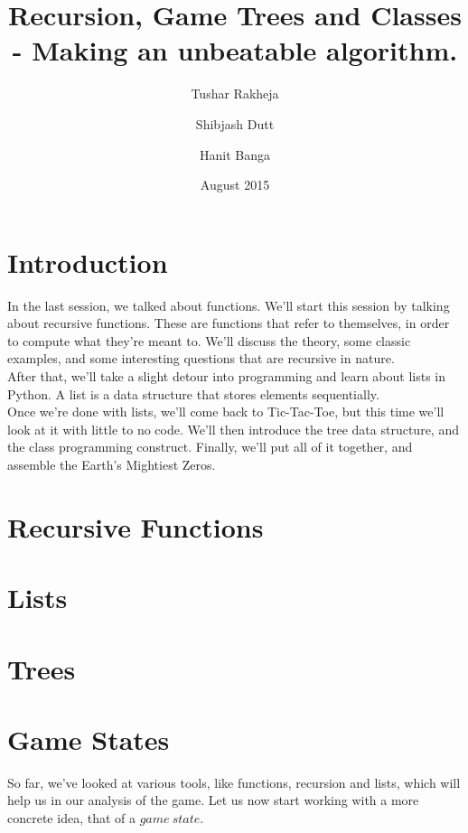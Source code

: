 \documentclass{article}
\title{Recursion, Game Trees and Classes - Making an unbeatable algorithm.}
\author[]{Tushar Rakheja}
\author[]{Shibjash Dutt}
\author[]{Hanit Banga}
\affil[]{\texttt{Instructors @ Endofline Computer Club}}
\date{August 2015}
\begin{document}
\maketitle

\section{Introduction}

In the last session, we talked about functions. We'll start this session by talking about recursive functions. These are functions that refer to themselves, in order to compute what they're meant to. We'll discuss the theory, some classic examples, and some interesting questions that are recursive in nature. \\

\noindent After that, we'll take a slight detour into programming and learn about lists in Python. A list is a data structure \cite{DSinPres_Slide} that stores elements sequentially.\\

\noindent Once we're done with lists, we'll come back to Tic-Tac-Toe, but this time we'll look at it with little to no code. We'll then introduce the tree data structure, and the class programming construct. Finally, we'll put all of it together, and assemble the Earth's Mightiest Zeros. 

\section{Recursive Functions}

\section{Lists}

\section{Trees}

\section{Game States} 

So far, we've looked at various tools, like functions, recursion and lists,
which will help us in our analysis of the game. Let us now start working with
a more concrete idea, that of a $game\ state$. \\
\end{document}

